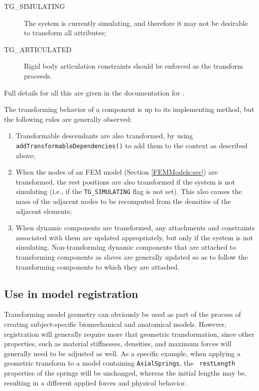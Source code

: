 \begin{description}

\item[TG\_SIMULATING]\mbox{}

The system is currently simulating, and therefore it may not be
desirable to transform all attributes;

\item[TG\_ARTICULATED]\mbox{}

Rigid body articulation constraints should
be enforced as the transform proceeds.

\end{description}

Full details for all this are given in the documentation for
.

The transforming behavior of a component is up to its implementing
method, but the following rules are generally observed:

\begin{enumerate}

\item Transformable descendants are also transformed, by using {\tt
addTransformableDependencies()} to add them to the context as described
above;

\item When the nodes of an FEM model (Section \ref{FEMModels:sec}) are
transformed, the rest positions are also transformed if the system is
not simulating (i.e., if the {\tt TG\_SIMULATING} flag is not set).
This also causes the mass of the adjacent nodes to be recomputed from
the densities of the adjacent elements;

\item When dynamic components are transformed, any attachments and
constraints associated with them are updated appropriately, but only
if the system is not simulating. Non-transforming dynamic components
that are attached to transforming components as slaves are generally
updated so as to follow the transforming components to which they are
attached.

\end{enumerate}

\subsection{Use in model registration}

Transforming model geometry can obviously be used as part of the
process of creating subject-specific biomechanical and anatomical
models. However, registration will generally require more that
geometric transformation, since other properties, such as material
stiffnesses, densities, and maximum forces will generally need to be
adjusted as well. As a specific example, when applying a geometric
transform to a model containing {\tt AxialSprings}, the {\tt
restLength} properties of the springs will be unchanged, whereas the
initial lengths may be, resulting in a different applied forces and
physical behavior.

